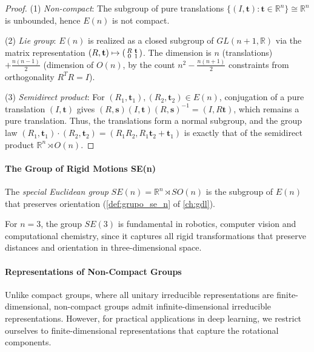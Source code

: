 \begin{proof}
(1) \textit{Non-compact}: The subgroup of pure translations $\{(I, \mathbf{t}) : \mathbf{t} \in \mathbb{R}^n\} \cong \mathbb{R}^n$ is unbounded, hence $E(n)$ is not compact.

(2) \textit{Lie group}: $E(n)$ is realized as a closed subgroup of $GL(n+1, \mathbb{R})$ via the matrix representation $(R, \mathbf{t}) \mapsto \begin{psmallmatrix} R & \mathbf{t} \\ 0 & 1 \end{psmallmatrix}$. The dimension is $n$ (translations) $+ \frac{n(n-1)}{2}$ (dimension of $O(n)$, by the count $n^2 - \frac{n(n+1)}{2}$ constraints from orthogonality $R^TR = I$).

(3) \textit{Semidirect product}: For $(R_1, \mathbf{t}_1), (R_2, \mathbf{t}_2) \in E(n)$, conjugation of a pure translation $(I, \mathbf{t})$ gives $(R, \mathbf{s})(I, \mathbf{t})(R, \mathbf{s})^{-1} = (I, R\mathbf{t})$, which remains a pure translation. Thus, the translations form a normal subgroup, and the group law $(R_1, \mathbf{t}_1) \cdot (R_2, \mathbf{t}_2) = (R_1 R_2, R_1 \mathbf{t}_2 + \mathbf{t}_1)$ is exactly that of the semidirect product $\mathbb{R}^n \rtimes O(n)$.
\end{proof}

\paragraph{The Group of Rigid Motions SE(n)}

The \textit{special Euclidean group} $SE(n) = \mathbb{R}^n \rtimes SO(n)$ is the subgroup of $E(n)$ that preserves orientation (\autoref{def:grupo_se_n} of \autoref{ch:gdl}).\label{def:grupo_se_n_cnn}

For $n = 3$, the group $SE(3)$ is fundamental in robotics, computer vision and computational chemistry, since it captures all rigid transformations that preserve distances and orientation in three-dimensional space.

\paragraph{Representations of Non-Compact Groups}

Unlike compact groups, where all unitary irreducible representations are finite-dimensional, non-compact groups admit infinite-dimensional irreducible representations. However, for practical applications in deep learning, we restrict ourselves to finite-dimensional representations that capture the rotational components.

